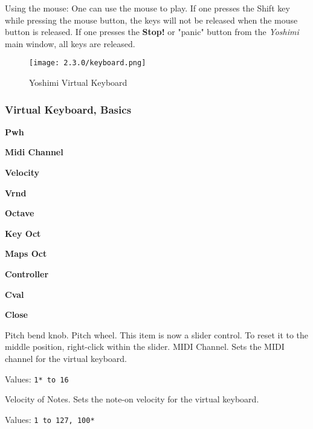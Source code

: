    Using the mouse: One can use the mouse to play.  If one presses the
   Shift key while pressing the mouse button, the keys will not be released
   when the mouse button is released.  If one presses the \textbf{Stop!} or
   "panic" button from the \textsl{Yoshimi} main window,
   all keys are released.

\begin{figure}[H]
   \centering
   \texttt{[image: 2.3.0/keyboard.png]}
   \caption{Yoshimi Virtual Keyboard}
   \label{fig:yoshimi_virtual_keyboard}
\end{figure}

\subsubsection{Virtual Keyboard, Basics}
\label{subsubsec:virtual_keyboard_basics}

   \begin{enumber}
      \item \textbf{Pwh}
      \item \textbf{Midi Channel}
      \item \textbf{Velocity}
      \item \textbf{Vrnd}
      \item \textbf{Octave}
      \item \textbf{Key Oct}
      \item \textbf{Maps Oct}
      \item \textbf{Controller}
      \item \textbf{Cval}
      \item \textbf{Close}
   \end{enumber}

   \setcounter{ItemCounter}{0}      %

   Pitch bend knob. Pitch wheel.
   This item is now a slider control.  To reset it to the middle position,
   right-click within the slider.
   MIDI Channel.
   Sets the MIDI channel for the virtual keyboard.

   Values: \texttt{1* to 16}

   Velocity of Notes.
   Sets the note-on velocity for the virtual keyboard.

   Values: \texttt{1 to 127, 100*}

